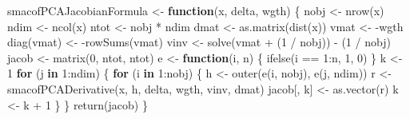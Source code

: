 \documentclass[
  12pt,
  letterpaper,
  DIV=11,
  numbers=noendperiod]{scrartcl}
\newenvironment{Shaded}{\begin{snugshade}}{\end{snugshade}}
\newcommand{\ControlFlowTok}[1]{\textcolor[rgb]{0.00,0.23,0.31}{\textbf{#1}}}
\newcommand{\DecValTok}[1]{\textcolor[rgb]{0.68,0.00,0.00}{#1}}
\newcommand{\FunctionTok}[1]{\textcolor[rgb]{0.28,0.35,0.67}{#1}}
\newcommand{\NormalTok}[1]{\textcolor[rgb]{0.00,0.23,0.31}{#1}}
\newcommand{\OtherTok}[1]{\textcolor[rgb]{0.00,0.23,0.31}{#1}}
\newcommand{\SpecialCharTok}[1]{\textcolor[rgb]{0.37,0.37,0.37}{#1}}
\begin{document}
\begin{Shaded}
\begin{Highlighting}[]
\NormalTok{smacofPCAJacobianFormula }\OtherTok{\textless{}{-}} \ControlFlowTok{function}\NormalTok{(x, delta, wgth) \{}
\NormalTok{  nobj }\OtherTok{\textless{}{-}} \FunctionTok{nrow}\NormalTok{(x)}
\NormalTok{  ndim }\OtherTok{\textless{}{-}} \FunctionTok{ncol}\NormalTok{(x)}
\NormalTok{  ntot }\OtherTok{\textless{}{-}}\NormalTok{ nobj }\SpecialCharTok{*}\NormalTok{ ndim}
\NormalTok{  dmat }\OtherTok{\textless{}{-}} \FunctionTok{as.matrix}\NormalTok{(}\FunctionTok{dist}\NormalTok{(x))}
\NormalTok{  vmat }\OtherTok{\textless{}{-}} \SpecialCharTok{{-}}\NormalTok{wgth}
  \FunctionTok{diag}\NormalTok{(vmat) }\OtherTok{\textless{}{-}} \SpecialCharTok{{-}}\FunctionTok{rowSums}\NormalTok{(vmat)}
\NormalTok{  vinv }\OtherTok{\textless{}{-}} \FunctionTok{solve}\NormalTok{(vmat }\SpecialCharTok{+}\NormalTok{ (}\DecValTok{1} \SpecialCharTok{/}\NormalTok{ nobj)) }\SpecialCharTok{{-}}\NormalTok{ (}\DecValTok{1} \SpecialCharTok{/}\NormalTok{ nobj)}
\NormalTok{  jacob }\OtherTok{\textless{}{-}} \FunctionTok{matrix}\NormalTok{(}\DecValTok{0}\NormalTok{, ntot, ntot)}
\NormalTok{  e }\OtherTok{\textless{}{-}} \ControlFlowTok{function}\NormalTok{(i, n) \{}
    \FunctionTok{ifelse}\NormalTok{(i }\SpecialCharTok{==} \DecValTok{1}\SpecialCharTok{:}\NormalTok{n, }\DecValTok{1}\NormalTok{, }\DecValTok{0}\NormalTok{)}
\NormalTok{  \}}
\NormalTok{  k }\OtherTok{\textless{}{-}} \DecValTok{1}
  \ControlFlowTok{for}\NormalTok{ (j }\ControlFlowTok{in} \DecValTok{1}\SpecialCharTok{:}\NormalTok{ndim) \{}
    \ControlFlowTok{for}\NormalTok{ (i }\ControlFlowTok{in} \DecValTok{1}\SpecialCharTok{:}\NormalTok{nobj) \{}
\NormalTok{      h }\OtherTok{\textless{}{-}} \FunctionTok{outer}\NormalTok{(}\FunctionTok{e}\NormalTok{(i, nobj), }\FunctionTok{e}\NormalTok{(j, ndim))}
\NormalTok{      r }\OtherTok{\textless{}{-}} \FunctionTok{smacofPCADerivative}\NormalTok{(x, h, delta, wgth, vinv, dmat)}
\NormalTok{      jacob[, k] }\OtherTok{\textless{}{-}} \FunctionTok{as.vector}\NormalTok{(r)}
\NormalTok{      k }\OtherTok{\textless{}{-}}\NormalTok{ k }\SpecialCharTok{+} \DecValTok{1}
\NormalTok{    \}}
\NormalTok{  \}}
  \FunctionTok{return}\NormalTok{(jacob)}
\NormalTok{\}}


\end{Highlighting}
\end{Shaded}
\end{document}
